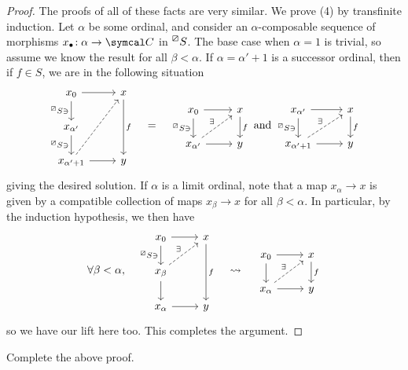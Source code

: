 \begin{proof}
The proofs of all of these facts are very similar. We prove (4) by transfinite induction. Let \(\alpha\) be some ordinal, and consider an \(\alpha\)-composable sequence of morphisms
\(x_\bullet\!:\alpha\to\calC\) in \(\prescript{\boxslash}{}{S}\). The base case when \(\alpha=1\) is trivial, so assume we know the result for all \(\beta < \alpha\). If \(\alpha = \alpha'+1\) is a successor ordinal, then
if \(f\in S\), we are in the following situation
\[
	\begin{tikzcd}
		x_0\ar[d,"\prescript{\boxslash}{}{S}\ni"']\ar[r] & x\ar[dd,"f"] \\
		x_{\alpha'}\ar[d,"\prescript{\boxslash}{}{S}\ni"'] & \\
		x_{\alpha'+1}\ar[r]\ar[uur,dashed] & y
	\end{tikzcd}\quad = \quad
	\begin{tikzcd}
		x_0 \ar[d,"\prescript{\boxslash}{}{S}\ni"']\ar[r] & x\ar[d,"f"] \\
		x_{\alpha'}\ar[r]\ar[ur,dashed,"\exists"] & y
	\end{tikzcd}\text{ and }
	\begin{tikzcd}
		x_{\alpha'} \ar[d,"\prescript{\boxslash}{}{S}\ni"']\ar[r] & x\ar[d,"f"] \\
		x_{\alpha'+1}\ar[r]\ar[ur,dashed,"\exists"] & y
	\end{tikzcd}
\]
giving the desired solution. If \(\alpha\) is a limit ordinal, note that a map \(x_\alpha \to x\) is given by a compatible collection of maps \(x_\beta\to x\) for all \(\beta < \alpha\). In
particular, by the induction hypothesis, we then have
\[
	\forall \beta < \alpha,\quad
	\begin{tikzcd}
		x_0\ar[d,"\prescript{\boxslash}{}{S}\ni"']\ar[r] & x\ar[dd,"f"] \\
		x_\beta\ar[d]\ar[ur,dashed,"\exists"] & \\
		x_\alpha\ar[r] & y
	\end{tikzcd}\quad\leadsto\quad
	\begin{tikzcd}
		x_0\ar[d]\ar[r] & x\ar[d,"f"] \\
		x_\alpha\ar[r]\ar[ur,dashed,"\exists"] & y
	\end{tikzcd}
\]
so we have our lift here too. This completes the argument.
\end{proof}
\begin{exercise}
	Complete the above proof.
\end{exercise}

